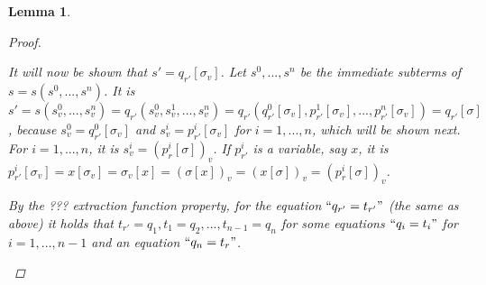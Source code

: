 \documentclass[11pt]{article} %
\newtheorem{lemma}{Lemma}
\begin{document}
\begin{lemma}
\begin{proof}
\begin{enumerate}
It will now be shown that $s' = q_{r'}[\sigma_v]$. Let $s^0, ..., s^n$ be the immediate subterms of $s = s(s^0, ..., s^n)$. It is $s' = s(s^0_v, ..., s^n_v) = q_{r'}(s^0_v, s^1_v, ..., s^n_v) = q_{r'}(q^0_{r'}[\sigma_v], p^1_{r'}[\sigma_v], ..., p^n_{r'}[\sigma_v]) = q_{r'}[\sigma]$, because $s^0_v = q^0_{r'}[\sigma_v]$ and $s^i_v = p^i_{r'}[\sigma_v]$ for $i = 1, ..., n$, which will be shown next. For $i = 1, ..., n$, it is $s^i_v = (p^i_r[\sigma])_v$. If $p^i_{r'}$ is a variable, say $x$, it is $p^i_{r'}[\sigma_v] = x[\sigma_v] = \sigma_v[x] = (\sigma[x])_v = (x[\sigma])_v = (p^i_r[\sigma])_v$. 

By the ??? extraction function property, for the equation $`` q_{r'} = t_{r'} "$ (the same as above) it holds that $t_{r'} = q_1, t_1 = q_2, ..., t_{n-1} = q_n$ for some equations $`` q_i = t_i "$ for $i = 1, ..., n-1$ and an equation $`` q_n = t_r "$.


\end{enumerate}
\end{proof}
\end{lemma}
\end{document}
